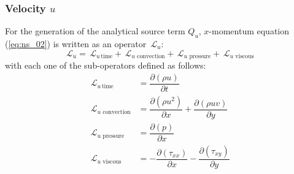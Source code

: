 \documentclass[10pt]{article}
\newcommand{\Diff}[2] {\dfrac{\partial( #1)}{\partial #2}}
\newcommand{\Lo}{\,\mathcal{L}}
\newcommand{\convection}{\,\text{convection}}
\newcommand{\viscous}{\,\text{viscous}}
\newcommand{\pressure}{\,\text{pressure}}
\begin{document}
\subsubsection{Velocity $u$}
For the generation of the analytical source term $Q_u$, $x$-momentum equation (\ref{eq:ns_02}) is written as an operator $\Lo_u$:
 $$\Lo_u = \Lo_{u \, \text{time}}+\Lo_{u \, \convection}+\Lo_{u \, \pressure }+\Lo_{u \, \viscous }$$
with each one of the sub-operators defined as follows:
\begin{equation*}
 \begin{split}
\Lo_{u \, \text{time}}&= \Diff{\rho u}{t} \\
\Lo_{u \, \convection}&= \Diff{\rho u^2 }{x}+\Diff{\rho uv}{y} \\
\Lo_{u \, \pressure }&= \Diff{p}{x}\\
\Lo_{u \, \viscous }&= -\Diff{\tau_{xx}}{x}-\Diff{\tau_{xy}}{y}
 \end{split}
\end{equation*}
\end{document}
